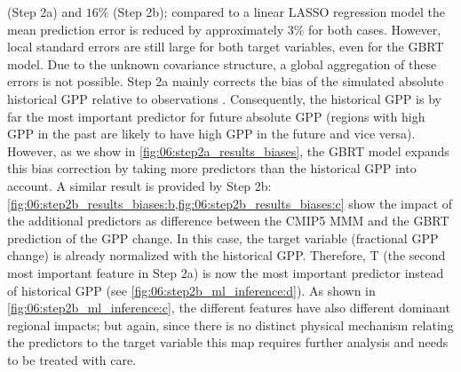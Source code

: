 (Step 2a) and $16 \unit{\%}$ (Step 2b); compared to a linear \ac{LASSO}
regression model the mean prediction error is reduced by approximately $3
\unit{\%}$ for both cases. However, local standard errors are still large for
both target variables, even for the \ac{GBRT} model. Due to the unknown
covariance structure, a global aggregation of these errors is not possible.
Step 2a mainly corrects the bias of the simulated absolute historical \ac{GPP}
relative to observations \autocite{Anav2013}. Consequently, the historical
\ac{GPP} is by far the most important predictor for future absolute \ac{GPP}
(regions with high \ac{GPP} in the past are likely to have high \ac{GPP} in the
future and vice versa). However, as we show in
\cref{fig:06:step2a_results_biases}, the \ac{GBRT} model expands this bias
correction by taking more predictors than the historical \ac{GPP} into account.
A similar result is provided by Step 2b:
\cref{fig:06:step2b_results_biases:b,fig:06:step2b_results_biases:c} show the
impact of the additional predictors as difference between the \acs{CMIP}5
\ac{MMM} and the \ac{GBRT} prediction of the \ac{GPP} change. In this case, the
target variable (fractional \ac{GPP} change) is already normalized with the
historical \ac{GPP}. Therefore, \ac{T} (the second most important feature in
Step 2a) is now the most important predictor instead of historical \ac{GPP}
(see \cref{fig:06:step2b_ml_inference:d}). As shown in
\cref{fig:06:step2b_ml_inference:c}, the different features have also different
dominant regional impacts; but again, since there is no distinct physical
mechanism relating the predictors to the target variable this map requires
further analysis and needs to be treated with care.

